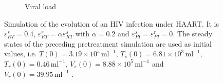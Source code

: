 \begin{figure}
\begin{subfigure}[b]{0.475\textwidth}
        \caption[]%
        {{\small Viral load}}    
        \label{fig2c:viral_load}
    \end{subfigure}
    \caption[]{Simulation of the evolution of an HIV infection under HAART.
    It is $\varepsilon_{RT}^s = 0.4$, $\varepsilon_{RT}^r = \alpha \varepsilon_{RT}^s$ with $\alpha = 0.2$ and 
    $\varepsilon_{PI}^s = \varepsilon_{PI}^r = 0$.
    The steady states of the preceding pretreatment simulation are used as initial values, i.e. $T(0) = 3.19 \times 10^{5} \, \text{ml}^{-1}$, 
    $T_s(0) = 6.81 \times 10^{3} \, \text{ml}^{-1}$, $T_r(0) = 0.46 \, \text{ml}^{-1}$, $V_s(0) = 8.88 \times 10^{5} \, \text{ml}^{-1}$ 
    and $V_r(0) = 39.95 \, \text{ml}^{-1}$ \cite{perelson1993dynamics}.}
    \label{fig2:treated_eRT_04_alpha_02}
\end{figure}

